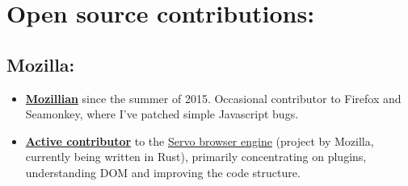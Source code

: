 \documentclass[11pt,a4paper,sans]{moderncv}        %
\newcommand\chref[3][linky]{\href{#2}{\color{#1}#3}}
\begin{document}


\vspace*{-2\baselineskip}
\makecvtitle
\vspace{-2\baselineskip}



\section{Open source contributions:}
\subsection{Mozilla:}
\begin{itemize}
\item \textbf{\chref{https://mozillians.org/en-US/u/wafflespeanut/}{Mozillian}} since the summer of 2015. Occasional contributor to Firefox and Seamonkey, where I've patched simple Javascript bugs.
\item \textbf{\chref{http://servostat.youknowone.org/\#author-wafflespeanut-a-gmail-o-com}{Active contributor}} to the \chref{https://github.com/servo/servo}{Servo browser engine} (project by Mozilla, currently being written in Rust), primarily concentrating on plugins, understanding DOM and improving the code structure.
\end{itemize}
\end{document}
